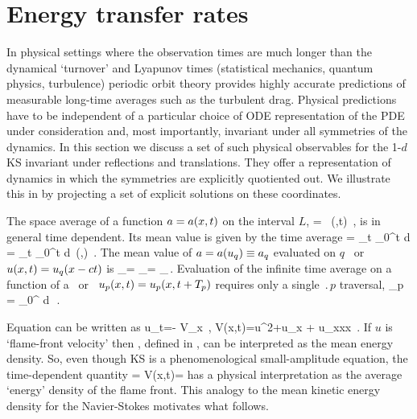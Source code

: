 \section{Energy transfer rates} %
\label{sec:energy}

In physical settings where the observation times are much longer than
the dynamical `turnover' and Lyapunov times (statistical mechanics,
quantum physics, turbulence) periodic orbit theory provides
highly accurate predictions of measurable long-time averages such as
the turbulent drag. Physical predictions have to be
independent of a particular choice of ODE representation of the PDE
under consideration and, most importantly, invariant under all
symmetries of the dynamics. In this section we discuss a set of such
physical observables for the  1-$d$ KS invariant under reflections and
translations. They offer a representation of dynamics in which the
symmetries are explicitly quotiented out. We illustrate  this in
 by projecting a set of explicit solutions on
these coordinates.

The {space average} of a function $a = a(x,t)$  on
the interval $L$,
\beq
    \expct{\obser} = \Lint{\pSpace}\, \obser(\pSpace,t)
    \,,
    \label{rpo:spac_ave}
\eeq
is in general time dependent.
Its mean value is given by the {time average}
\beq
\timeAver{\obser}
    =
\lim_{t\rightarrow \infty}  \int_0^t \! d\tau \, \expct{\obser}
    =
\lim_{t\rightarrow \infty}  \int_0^t \!
    \Lint{\tau}  d\pSpace\, \obser(\pSpace,\tau)
    \,.
\label{rpo:tim_ave}
\eeq
The mean value
of $a = a(u_q) \equiv a_q$ evaluated on $q$
\eqv\ or {\reqv} $u(x,t) = u_q(x-ct)$ is
\beq
\timeAver{\obser}_\stagn = \expct{\obser}_\stagn = \obser_\stagn\,.
\label{rpo:u-eqv} \eeq Evaluation of the infinite time average
 on a function of a \po\ or \rpo\
$u_p(x,t)=u_p(x,t+{T_{p}})$ requires only a single
$\period{p}$ traversal,
\beq
  \timeAver{\obser}_p = 
    \int_0^{\period{p}} \! d\tau \, \expct{\obser}
\,.
\label{rpo:u-cyc}
\eeq

Equation  can be written as %
\beq
    u_t=- V_x
        \,,\qquad
    V(x,t)={\textstyle{}}u^2+u_{x} + u_{xxx}
    \,.
 If $u$ is `flame-front velocity' then \expctE, defined in
\refeq{eq:stdks}, can be interpreted as the mean energy density.
%
So, even though KS is a phenomenological
small-amplitude equation, the time-dependent quantity
\beq
    \expctE=
  \Lint{\pSpace}
  V(x,t)=
  \Lint{\pSpace} 
  \label{ksEnergy} \eeq
has a physical interpretation as the average `energy'
density of the flame front. This analogy to the mean kinetic energy
density for the Navier-Stokes motivates what follows.

